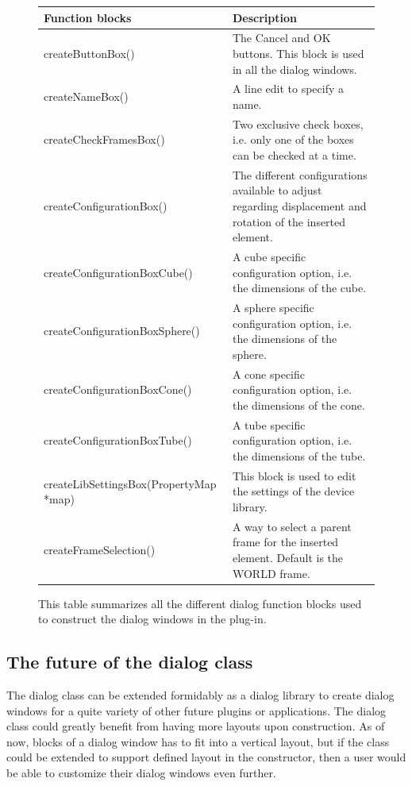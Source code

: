 \begin{figure} [h] %
\centering
\begin{center}
  \begin{tabular}{ | p{6cm} | p{7cm} |}
    \hline
    \textbf{Function blocks} 	   &   \textbf{Description}  \\ \hline
    createButtonBox()			   &   The Cancel and OK buttons. This block is used in all the dialog windows.   		\\ \hline
    createNameBox() 			   &   A line edit to specify a name.   		\\ \hline
    createCheckFramesBox()		   &   Two exclusive check boxes, i.e. only one of the boxes can be checked at a time.		\\ \hline
    createConfigurationBox() 	   &   The different configurations available to adjust regarding displacement and rotation of the inserted element. 		\\ \hline
	createConfigurationBoxCube()   &   A cube specific configuration option, i.e. the dimensions of the cube.  	\\ \hline	    
	createConfigurationBoxSphere() &   A sphere specific configuration option, i.e. the dimensions of the sphere. 	\\ \hline	
	createConfigurationBoxCone()   &   A cone specific configuration option, i.e. the dimensions of the cone.  	\\ \hline	
    createConfigurationBoxTube()   &   A tube specific configuration option, i.e. the dimensions of the tube.  	\\ \hline	
	createLibSettingsBox(PropertyMap *map)		   &   This block is used to edit the settings of the device library.    	\\ \hline	 
	createFrameSelection()		   &   A way to select a parent frame for the inserted element. Default is the WORLD frame.		\\
    \hline
  \end{tabular}
\end{center}
\caption{This table summarizes all the different dialog function blocks used to construct the dialog windows in the plug-in.}
\label{fig:dialogBlocks} 
\end{figure}

\subsection{The future of the dialog class}
The dialog class can be extended formidably as a dialog library to create dialog windows for a quite variety of other future plugins or applications. The dialog class could greatly benefit from having more layouts upon construction. As of now, blocks of a dialog window has to fit into a vertical layout, but if the class could be extended to support defined layout in the constructor, then a user would be able to customize their dialog windows even further. 

